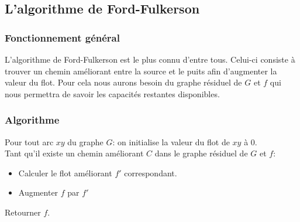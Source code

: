 \documentclass[a4paper]{article}
\begin{document}
\begin{center}
\end{center}


\subsection{L'algorithme de Ford-Fulkerson}

\subsubsection{Fonctionnement général}
L'algorithme de Ford-Fulkerson est le plus connu d'entre tous. Celui-ci consiste à trouver un chemin améliorant entre la source et le puits afin d'augmenter la valeur du flot. Pour cela nous aurons besoin du graphe résiduel de $G$ et $f$ qui nous permettra de savoir les capacités restantes disponibles.\\

\subsubsection{Algorithme}
Pour tout arc $xy$ du graphe $G$: on initialise la valeur du flot de $xy$ à $0$.\\
Tant qu'il existe un chemin améliorant $C$ dans le graphe résiduel de $G$ et $f$:
\begin{itemize}
	\item
    Calculer le flot améliorant $f'$ correspondant.
    \item 
    Augmenter $f$ par $f'$
\end{itemize}
Retourner $f$.\\
\end{document}
